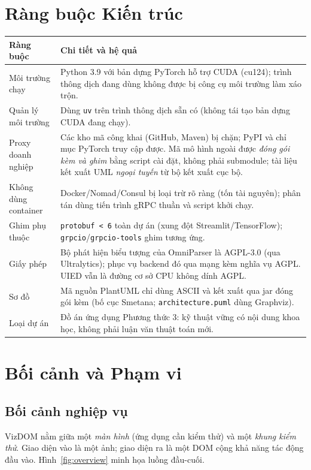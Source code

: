 \documentclass[11pt,a4paper]{report}
\newcommand{\code}[1]{\texttt{#1}}
\begin{document}
\chapter{Ràng buộc Kiến trúc}
\begin{longtable}{@{}p{3.6cm}p{11.0cm}@{}}
\toprule
\textbf{Ràng buộc} & \textbf{Chi tiết và hệ quả} \\
\midrule
\endhead
Môi trường chạy & Python 3.9 với bản dựng PyTorch hỗ trợ CUDA (cu124); trình thông dịch đang dùng không được bị công cụ môi trường làm xáo trộn. \\
Quản lý môi trường & Dùng \code{uv} trên trình thông dịch sẵn có (không tái tạo bản dựng CUDA đang chạy). \\
Proxy doanh nghiệp & Các kho mã công khai (GitHub, Maven) bị chặn; PyPI và chỉ mục PyTorch truy cập được. Mã mô hình ngoài được \emph{đóng gói kèm và ghim} bằng script cài đặt, không phải submodule; tài liệu kết xuất UML \emph{ngoại tuyến} từ bộ kết xuất cục bộ. \\
Không dùng container & Docker/Nomad/Consul bị loại trừ rõ ràng (tốn tài nguyên); phân tán dùng tiến trình gRPC thuần và script khởi chạy. \\
Ghim phụ thuộc & \code{protobuf < 6} toàn dự án (xung đột Streamlit/TensorFlow); \code{grpcio}/\code{grpcio-tools} ghim tương ứng. \\
Giấy phép & Bộ phát hiện biểu tượng của OmniParser là AGPL-3.0 (qua Ultralytics); phục vụ backend đó qua mạng kèm nghĩa vụ AGPL. UIED vẫn là đường cơ sở CPU không dính AGPL. \\
Sơ đồ & Mã nguồn PlantUML chỉ dùng ASCII và kết xuất qua jar đóng gói kèm (bố cục Smetana; \code{architecture.puml} dùng Graphviz). \\
Loại dự án & Đồ án ứng dụng Phương thức 3: kỹ thuật vững có nội dung khoa học, không phải luận văn thuật toán mới. \\
\bottomrule
\end{longtable}

\chapter{Bối cảnh và Phạm vi}
\section{Bối cảnh nghiệp vụ}
VizDOM nằm giữa một \emph{màn hình} (ứng dụng cần kiểm thử) và một \emph{khung kiểm
thử}. Giao diện vào là một ảnh; giao diện ra là một DOM cộng khả năng tác động đầu
vào. Hình~\ref{fig:overview} minh họa luồng đầu-cuối.
\end{document}
